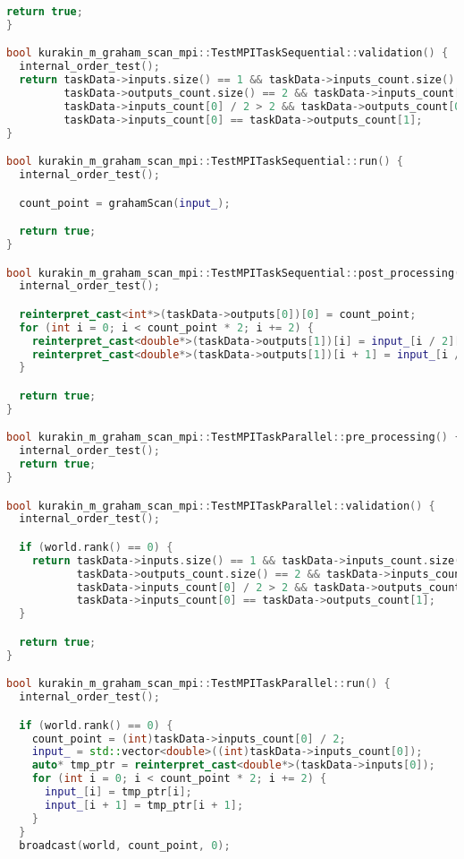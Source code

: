 \documentclass[12pt]{article}
\begin{document}
\begin{lstlisting}[language=C++]
  return true;
}

bool kurakin_m_graham_scan_mpi::TestMPITaskSequential::validation() {
  internal_order_test();
  return taskData->inputs.size() == 1 && taskData->inputs_count.size() == 1 && taskData->outputs.size() == 2 &&
         taskData->outputs_count.size() == 2 && taskData->inputs_count[0] % 2 == 0 &&
         taskData->inputs_count[0] / 2 > 2 && taskData->outputs_count[0] == 1 &&
         taskData->inputs_count[0] == taskData->outputs_count[1];
}

bool kurakin_m_graham_scan_mpi::TestMPITaskSequential::run() {
  internal_order_test();

  count_point = grahamScan(input_);

  return true;
}

bool kurakin_m_graham_scan_mpi::TestMPITaskSequential::post_processing() {
  internal_order_test();

  reinterpret_cast<int*>(taskData->outputs[0])[0] = count_point;
  for (int i = 0; i < count_point * 2; i += 2) {
    reinterpret_cast<double*>(taskData->outputs[1])[i] = input_[i / 2][0];
    reinterpret_cast<double*>(taskData->outputs[1])[i + 1] = input_[i / 2][1];
  }

  return true;
}

bool kurakin_m_graham_scan_mpi::TestMPITaskParallel::pre_processing() {
  internal_order_test();
  return true;
}

bool kurakin_m_graham_scan_mpi::TestMPITaskParallel::validation() {
  internal_order_test();

  if (world.rank() == 0) {
    return taskData->inputs.size() == 1 && taskData->inputs_count.size() == 1 && taskData->outputs.size() == 2 &&
           taskData->outputs_count.size() == 2 && taskData->inputs_count[0] % 2 == 0 &&
           taskData->inputs_count[0] / 2 > 2 && taskData->outputs_count[0] == 1 &&
           taskData->inputs_count[0] == taskData->outputs_count[1];
  }

  return true;
}

bool kurakin_m_graham_scan_mpi::TestMPITaskParallel::run() {
  internal_order_test();

  if (world.rank() == 0) {
    count_point = (int)taskData->inputs_count[0] / 2;
    input_ = std::vector<double>((int)taskData->inputs_count[0]);
    auto* tmp_ptr = reinterpret_cast<double*>(taskData->inputs[0]);
    for (int i = 0; i < count_point * 2; i += 2) {
      input_[i] = tmp_ptr[i];
      input_[i + 1] = tmp_ptr[i + 1];
    }
  }
  broadcast(world, count_point, 0);


\end{lstlisting}
\end{document}
